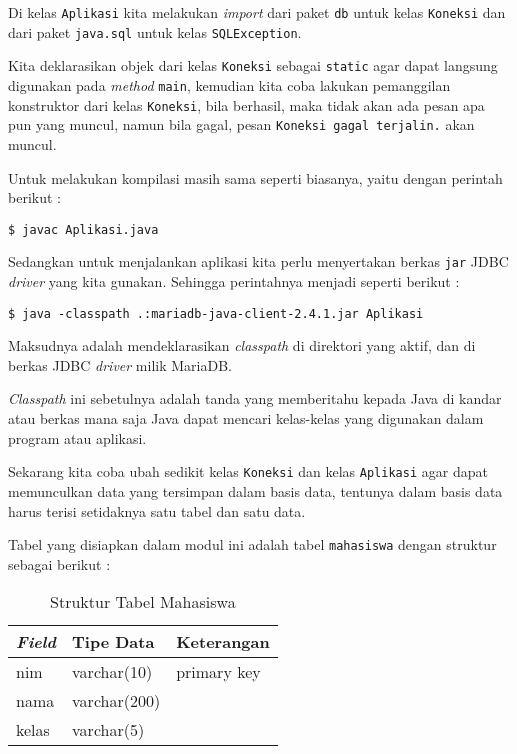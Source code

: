 Di kelas \texttt{Aplikasi} kita melakukan \textit{import} dari paket \texttt{db} untuk kelas \texttt{Koneksi} dan dari paket \texttt{java.sql} untuk kelas \texttt{SQLException}.

Kita deklarasikan objek dari kelas \texttt{Koneksi} sebagai \texttt{static} agar dapat langsung digunakan pada \textit{method} \texttt{main}, kemudian kita coba lakukan pemanggilan konstruktor dari kelas \texttt{Koneksi}, bila berhasil, maka tidak akan ada pesan apa pun yang muncul, namun bila gagal, pesan \texttt{Koneksi gagal terjalin.} akan muncul.

Untuk melakukan kompilasi masih sama seperti biasanya, yaitu dengan perintah berikut :

\begin{lstlisting}
$ javac Aplikasi.java
\end{lstlisting}

Sedangkan untuk menjalankan aplikasi kita perlu menyertakan berkas \texttt{jar} JDBC \textit{driver} yang kita gunakan. Sehingga perintahnya menjadi seperti berikut :

\begin{lstlisting}
$ java -classpath .:mariadb-java-client-2.4.1.jar Aplikasi
\end{lstlisting}

Maksudnya adalah mendeklarasikan \textit{classpath} di direktori yang aktif, dan di berkas JDBC \textit{driver} milik MariaDB.

\textit{Classpath} ini sebetulnya adalah tanda yang memberitahu kepada Java di kandar atau berkas mana saja Java dapat mencari kelas-kelas yang digunakan dalam program atau aplikasi.

Sekarang kita coba ubah sedikit kelas \texttt{Koneksi} dan kelas \texttt{Aplikasi} agar dapat memunculkan data yang tersimpan dalam basis data, tentunya dalam basis data harus terisi setidaknya satu tabel dan satu data.

Tabel yang disiapkan dalam modul ini adalah tabel \texttt{mahasiswa} dengan struktur sebagai berikut :


\begin{table}[H]
\begin{center}
\begin{tabular}{| l | l | l |}
\hline
\textit{\textbf{Field}} & \textbf{Tipe Data} & \textbf{Keterangan} \\
\hline \hline
nim & varchar(10) & primary key \\
\hline
nama & varchar(200) & \\
\hline
kelas & varchar(5) & \\
\hline
\end{tabular}
\caption{Struktur Tabel Mahasiswa}
\end{center}
\end{table}

